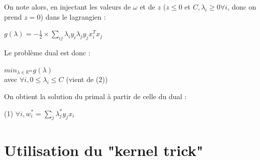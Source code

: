 \documentclass{article}
\begin{document}
On note alors, en injectant les valeurs de $\omega$ et de $z$ ($z \leq 0$ et $C, \lambda_i \geq 0 \forall i$, donc on prend $z=0$) dans le lagrangien :\\

              \begin{center}
              $g(\lambda) = -\frac{1}{2} \times \sum_{ij} \lambda_i y_i \lambda_j y_j x_i^{T} x_j$
              \end{center}

Le problème dual est donc :\\

             \begin{center}
             $min_{\lambda \in \mathbb{R}^{m}} g(\lambda)$\\ 
             avec $\forall i, 0 \leq \lambda_i \leq C$ (vient de (2))\\
             \end{center}

On obtient la solution du primal à partir de celle du dual :

             \begin{center}
             (1) $\forall i, w^{*}_i = \sum_j \lambda^{*}_j y_j x_i$
             \end{center}

\section{Utilisation du "kernel trick"}
\end{document}
